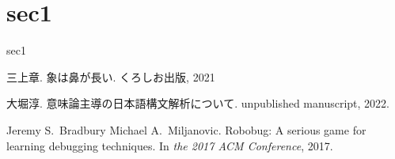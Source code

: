 \documentclass{jreport}
\begin{document}
\section{sec1}
sec1


% 
% 

\begin{thebibliography}{10}

三上章.
\newblock 象は鼻が長い.
\newblock くろしお出版, 2021

大堀淳.
\newblock 意味論主導の日本語構文解析について.
\newblock unpublished manuscript, 2022.

Jeremy S.~Bradbury Michael A.~Miljanovic.
\newblock Robobug: A serious game for learning debugging techniques.
\newblock In {\em the 2017 ACM Conference}, 2017.

\end{thebibliography}
\end{document}

